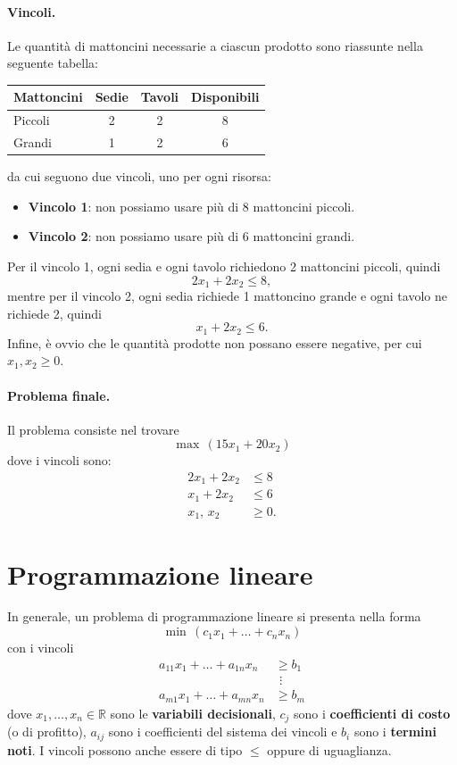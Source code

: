 \paragraph{Vincoli.}
Le quantità di mattoncini necessarie a ciascun prodotto sono riassunte nella seguente tabella:
\begin{center}
\begin{tabular}{lccc}
\toprule
Mattoncini & Sedie & Tavoli & Disponibili \\
\midrule
Piccoli & 2 & 2 & 8 \\
Grandi  & 1 & 2 & 6 \\
\bottomrule
\end{tabular}
\end{center}
da cui seguono due vincoli, uno per ogni risorsa:
\begin{itemize}
    \item \textbf{Vincolo 1}: non possiamo usare più di 8 mattoncini piccoli.
    \item \textbf{Vincolo 2}: non possiamo usare più di 6 mattoncini grandi.
\end{itemize}
Per il vincolo 1, ogni sedia e ogni tavolo richiedono 2 mattoncini piccoli, quindi
\[
2x_1 + 2x_2 \le 8,
\]
mentre per il vincolo 2, ogni sedia richiede 1 mattoncino grande e ogni tavolo ne richiede 2, quindi
\[
x_1 + 2x_2 \le 6.
\]
Infine, è ovvio che le quantità prodotte non possano essere negative, per cui $x_1, x_2 \ge 0$.

\paragraph{Problema finale.}
Il problema consiste nel trovare
\begin{equation}\label{eq:lego}
\max\, (15x_1 + 20x_2)
\end{equation}
dove i vincoli sono:
\[
\begin{aligned}
2x_1 + 2x_2 &\le 8 \\
x_1 + 2x_2 &\le 6 \\
x_1,\, x_2 &\ge 0.
\end{aligned}
\]

\section{Programmazione lineare}
In generale, un problema di programmazione lineare si presenta nella forma
\[
\min\, (c_1 x_1 + \dots + c_n x_n)
\]
con i vincoli
\[
\begin{aligned}
a_{11} x_1 + \dots + a_{1n} x_n &\ge b_1 \\
&\ \,\vdots \\
a_{m1} x_1 + \dots + a_{mn} x_n &\ge b_m
\end{aligned}
\]
dove $x_1, \dots, x_n \in \mathbb{R}$ sono le \textbf{variabili decisionali}, $c_j$ sono i \textbf{coefficienti di costo} (o di profitto), $a_{ij}$ sono i coefficienti del sistema dei vincoli e $b_i$ sono i \textbf{termini noti}. I vincoli possono anche essere di tipo $\le$ oppure di uguaglianza.

